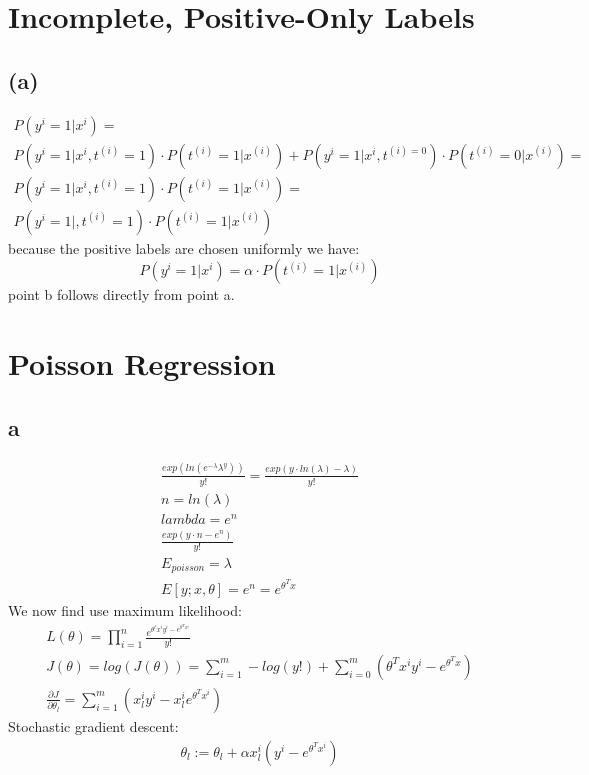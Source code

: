 \documentclass[11pt]{article}
\begin{document}
\section{ Incomplete, Positive-Only Labels}
\subsection{(a)}
\begin{gather*}
    P(y^{i}=1|x^{i}) = 
    \\
    P(y^{i}=1|x^{i},t^{(i)}=1)\cdot P(t^{(i)}=1|x^{(i)})+
    P(y^{i}=1|x^{i},t^{(i)=0})\cdot P(t^{(i)}=0|x^{(i)}) = 
    \\
    P(y^{i}=1|x^{i},t^{(i)}=1)\cdot P(t^{(i)}=1|x^{(i)})=\\
    P(y^{i}=1|,t^{(i)}=1)\cdot P(t^{(i)}=1|x^{(i)})
\end{gather*}
because the positive labels are chosen uniformly we have:
\begin{equation}
    P(y^{i}=1|x^{i}) = \alpha \cdot P(t^{(i)}=1|x^{(i)})
\end{equation}
point b follows directly from point a.
\section{Poisson Regression}
\subsection{a}
\begin{gather}
    \frac{exp(ln(e^{-\lambda}\lambda^y))}{y!}=
    \frac{exp(y\cdot ln(\lambda)-\lambda)}{y!}\\
    n = ln(\lambda)\\
    lambda = e^{n}\\
    \frac{exp(y\cdot n - e^{n})}{y!}\\
    E_{poisson} = \lambda\\
    E[y;x,\theta] = e^n = e^{\theta^Tx}
\end{gather}
We now find use maximum likelihood:
\begin{gather*}
   L(\theta) = \prod_{i = 1}^{n}\frac{e^{\theta^{t}x^{i}y^{i}-e^{\theta^{T}x^{i}}}}{y!} \\
    J(\theta)= log(J(\theta)) = \sum_{i = 1}^{m}-log(y!)+\sum_{i=0}^{m}(\theta^{T}x^{i}y^{i}-e^{\theta^{T}x})\\
    \frac{\partial J}{\partial \theta_{l}} = \sum_{i = 1}^{m}(x^{i}_{l}y^{i}-x^{i}_{l}e^{\theta^Tx^{i}})
\end{gather*}
Stochastic gradient descent:
\begin{gather*}
\theta_l := \theta_l+\alpha x^{i}_{l} (y^{i}-e^{\theta^{T}x^{i}})
\end{gather*}
\end{document}
